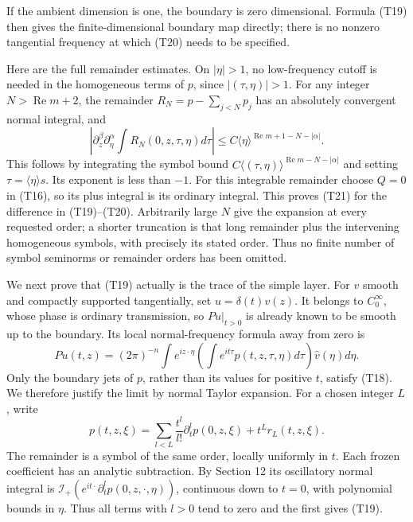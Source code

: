 \documentclass[
  11pt,
]{article}
\begin{document}
If the ambient dimension is one, the boundary is zero dimensional.
Formula (T19) then gives the finite-dimensional boundary map directly;
there is no nonzero tangential frequency at which (T20) needs to be
specified.

Here are the full remainder estimates. On \(|\eta|>1\), no low-frequency
cutoff is needed in the homogeneous terms of \(p\), since
\(|(\tau,\eta)|>1\). For any integer \(N>\operatorname{Re}m+2\), the
remainder \(R_N=p-\sum_{j<N}p_j\) has an absolutely convergent normal
integral, and \[
\left|\partial_z^\beta\partial_\eta^\alpha
\int R_N(0,z,\tau,\eta)d\tau\right|
\leq C\langle\eta\rangle^{\operatorname{Re}m+1-N-|\alpha|}.
\tag{T21}
\] This follows by integrating the symbol bound
\(C\langle(\tau,\eta)\rangle^{\operatorname{Re}m-N-|\alpha|}\) and
setting \(\tau=\langle\eta\rangle s\). Its exponent is less than \(-1\).
For this integrable remainder choose \(Q=0\) in (T16), so its plus
integral is its ordinary integral. This proves (T21) for the difference
in (T19)--(T20). Arbitrarily large \(N\) give the expansion at every
requested order; a shorter truncation is that long remainder plus the
intervening homogeneous symbols, with precisely its stated order. Thus
no finite number of symbol seminorms or remainder orders has been
omitted.

We next prove that (T19) actually is the trace of the simple layer. For
\(v\) smooth and compactly supported tangentially, set
\(u=\delta(t)v(z)\). It belongs to \(C_0^\infty\), whose phase is
ordinary transmission, so \(Pu|_{t>0}\) is already known to be smooth up
to the boundary. Its local normal-frequency formula away from zero is \[
Pu(t,z)=(2\pi)^{-n}\int e^{iz\cdot\eta}
\left(\int e^{it\tau}p(t,z,\tau,\eta)d\tau\right)
\widehat v(\eta)d\eta.
\tag{T22}
\] Only the boundary jets of \(p\), rather than its values for positive
\(t\), satisfy (T18). We therefore justify the limit by normal Taylor
expansion. For a chosen integer \(L\), write \[
p(t,z,\xi)=\sum_{l<L}\frac{t^l}{l!}\partial_t^l p(0,z,\xi)
+t^L r_L(t,z,\xi).
\tag{T23}
\] The remainder is a symbol of the same order, locally uniformly in
\(t\). Each frozen coefficient has an analytic subtraction. By Section
12 its oscillatory normal integral is
\(\mathcal I_+(e^{it\cdot}\partial_t^l p(0,z,\cdot,\eta))\), continuous
down to \(t=0\), with polynomial bounds in \(\eta\). Thus all terms with
\(l>0\) tend to zero and the first gives (T19).
\end{document}
